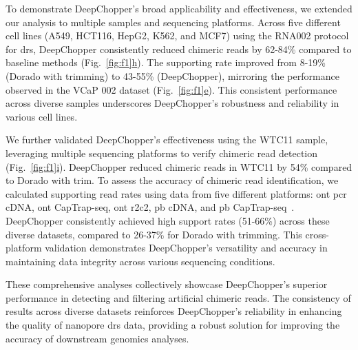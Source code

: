 \documentclass[pdflatex, sn-mathphys-num, lineno]{sn-jnl}%
\newcommand{\figref}[2]{Fig.~\hyperref[#1]{\ref*{#1}#2}}
\theoremstyle{thmstyleone}%
\theoremstyle{thmstyletwo}%
\theoremstyle{thmstylethree}%
\begin{document}
To demonstrate DeepChopper's broad applicability  and effectiveness, we extended our analysis to multiple samples and sequencing platforms.
Across five different cell lines (A549, HCT116, HepG2, K562, and MCF7) using the RNA002 protocol for \gls{drs}, DeepChopper consistently reduced chimeric reads by 62-84\% compared to baseline methods (\figref{fig:f1}{h}).
The supporting rate improved from 8-19\% (Dorado with trimming) to 43-55\% (DeepChopper), mirroring the performance observed in the VCaP 002 dataset (\figref{fig:f1}{e}).
This consistent performance across diverse samples underscores DeepChopper's robustness and reliability in various cell lines.

We further validated DeepChopper's effectiveness using the WTC11 sample, leveraging multiple sequencing platforms to verify chimeric read detection (\figref{fig:f1}{i}).
DeepChopper reduced chimeric reads in WTC11 by 54\% compared to Dorado with trim.
To assess the accuracy of chimeric read identification, we calculated supporting read rates using data from five different platforms: \gls{ont} \gls{pcr} cDNA, \gls{ont} CapTrap-seq, \gls{ont} \gls{r2c2}, \gls{pb} cDNA, and \gls{pb} CapTrap-seq~\cite{carbonell2024captrap}.
DeepChopper consistently achieved high support rates (51-66\%) across these diverse datasets, compared to 26-37\% for Dorado with trimming.
This cross-platform validation demonstrates DeepChopper's versatility and accuracy in maintaining data integrity across various sequencing conditions.

These comprehensive analyses collectively showcase DeepChopper's superior performance in detecting and filtering artificial chimeric reads.
The consistency of results across diverse datasets reinforces DeepChopper's reliability in enhancing the quality of nanopore \gls{drs} data, providing a robust solution for improving the accuracy of downstream genomics analyses.
\end{document}

